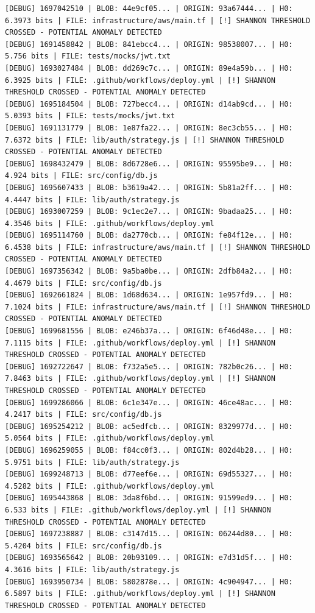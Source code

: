 \documentclass[12pt, a4paper, oneside]{report}
\begin{document}
\begin{lstlisting}[basicstyle=\tiny\ttfamily]
[DEBUG] 1697042510 | BLOB: 44e9cf05... | ORIGIN: 93a67444... | H0: 6.3973 bits | FILE: infrastructure/aws/main.tf | [!] SHANNON THRESHOLD CROSSED - POTENTIAL ANOMALY DETECTED
[DEBUG] 1691458842 | BLOB: 841ebcc4... | ORIGIN: 98538007... | H0: 5.756 bits | FILE: tests/mocks/jwt.txt
[DEBUG] 1693027484 | BLOB: dd269c7c... | ORIGIN: 89e4a59b... | H0: 6.3925 bits | FILE: .github/workflows/deploy.yml | [!] SHANNON THRESHOLD CROSSED - POTENTIAL ANOMALY DETECTED
[DEBUG] 1695184504 | BLOB: 727becc4... | ORIGIN: d14ab9cd... | H0: 5.0393 bits | FILE: tests/mocks/jwt.txt
[DEBUG] 1691131779 | BLOB: 1e87fa22... | ORIGIN: 8ec3cb55... | H0: 7.6372 bits | FILE: lib/auth/strategy.js | [!] SHANNON THRESHOLD CROSSED - POTENTIAL ANOMALY DETECTED
[DEBUG] 1698432479 | BLOB: 8d6728e6... | ORIGIN: 95595be9... | H0: 4.924 bits | FILE: src/config/db.js
[DEBUG] 1695607433 | BLOB: b3619a42... | ORIGIN: 5b81a2ff... | H0: 4.4447 bits | FILE: lib/auth/strategy.js
[DEBUG] 1693007259 | BLOB: 9c1ec2e7... | ORIGIN: 9badaa25... | H0: 4.3546 bits | FILE: .github/workflows/deploy.yml
[DEBUG] 1695114760 | BLOB: da2770cb... | ORIGIN: fe84f12e... | H0: 6.4538 bits | FILE: infrastructure/aws/main.tf | [!] SHANNON THRESHOLD CROSSED - POTENTIAL ANOMALY DETECTED
[DEBUG] 1697356342 | BLOB: 9a5ba0be... | ORIGIN: 2dfb84a2... | H0: 4.4679 bits | FILE: src/config/db.js
[DEBUG] 1692661824 | BLOB: 1d68d634... | ORIGIN: 1e957fd9... | H0: 7.1024 bits | FILE: infrastructure/aws/main.tf | [!] SHANNON THRESHOLD CROSSED - POTENTIAL ANOMALY DETECTED
[DEBUG] 1699681556 | BLOB: e246b37a... | ORIGIN: 6f46d48e... | H0: 7.1115 bits | FILE: .github/workflows/deploy.yml | [!] SHANNON THRESHOLD CROSSED - POTENTIAL ANOMALY DETECTED
[DEBUG] 1692722647 | BLOB: f732a5e5... | ORIGIN: 782b0c26... | H0: 7.8463 bits | FILE: .github/workflows/deploy.yml | [!] SHANNON THRESHOLD CROSSED - POTENTIAL ANOMALY DETECTED
[DEBUG] 1699286066 | BLOB: 6c1e347e... | ORIGIN: 46ce48ac... | H0: 4.2417 bits | FILE: src/config/db.js
[DEBUG] 1695254212 | BLOB: ac5edfcb... | ORIGIN: 8329977d... | H0: 5.0564 bits | FILE: .github/workflows/deploy.yml
[DEBUG] 1696259055 | BLOB: f84cc0f3... | ORIGIN: 802d4b28... | H0: 5.9751 bits | FILE: lib/auth/strategy.js
[DEBUG] 1699248713 | BLOB: d77eef6e... | ORIGIN: 69d55327... | H0: 4.5282 bits | FILE: .github/workflows/deploy.yml
[DEBUG] 1695443868 | BLOB: 3da8f6bd... | ORIGIN: 91599ed9... | H0: 6.533 bits | FILE: .github/workflows/deploy.yml | [!] SHANNON THRESHOLD CROSSED - POTENTIAL ANOMALY DETECTED
[DEBUG] 1697238887 | BLOB: c3147d15... | ORIGIN: 06244d80... | H0: 5.4204 bits | FILE: src/config/db.js
[DEBUG] 1693565642 | BLOB: 20b93109... | ORIGIN: e7d31d5f... | H0: 4.3616 bits | FILE: lib/auth/strategy.js
[DEBUG] 1693950734 | BLOB: 5802878e... | ORIGIN: 4c904947... | H0: 6.5897 bits | FILE: .github/workflows/deploy.yml | [!] SHANNON THRESHOLD CROSSED - POTENTIAL ANOMALY DETECTED
\end{lstlisting}
\end{document}
